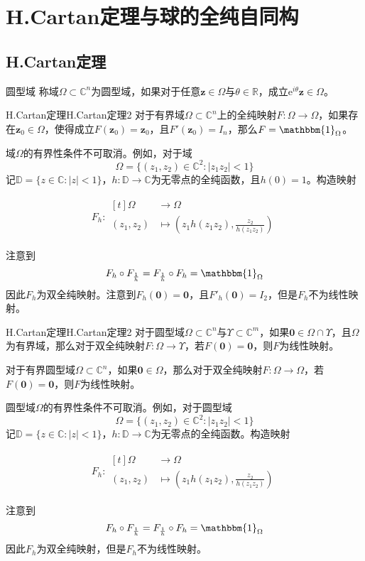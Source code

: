\documentclass[lang = cn, scheme = chinese, thmcnt = section]{elegantbook}
\newcommand{\R}{\mathbb{R}}            %
\newcommand{\C}{\mathbb{C}}  		   %
\newcommand{\sub}{\subset}             %
\newcommand{\bs}{\boldsymbol}          %
\newcommand{\function}[5]{
	\begin{align*}
		#1:\begin{aligned}[t]
			#2 &\longrightarrow #3\\
			#4 &\longmapsto #5
		\end{aligned}
	\end{align*}
}                                     %
\begin{document}
\section{H.Cartan定理与球的全纯自同构}

\subsection{H.Cartan定理}

\begin{definition}{圆型域}
	称域$\Omega\sub\C^n$为圆型域，如果对于任意$\bs{z}\in\Omega$与$\theta\in\R$，成立$\mathrm{e}^{i\theta}\bs{z}\in \Omega$。
\end{definition}

\begin{theorem}{H.Cartan定理}{H.Cartan定理2}
	对于有界域$\Omega\sub\C^n$上的全纯映射$F:\Omega\to\Omega$，如果存在$\bs{z}_0\in \Omega$，使得成立$F(\bs{z}_0)=\bs{z}_0$，且$F'(\bs{z}_0)=I_n$，那么$F=\mathbbm{1}_{\Omega}$。
\end{theorem}

\begin{remark}
	域$\Omega$的有界性条件不可取消。例如，对于域
	$$
	\Omega=\{ (z_1,z_2)\in\C^2:|z_1z_2|<1 \}
	$$
	记$\mathbb{D}=\{ z\in\C:|z|<1 \}$，$h:\mathbb{D}\to\C$为无零点的全纯函数，且$h(0)=1$。构造映射
	\function{F_h}{\Omega}{\Omega}{(z_1,z_2)}{\left(z_1h(z_1z_2),\frac{z_2}{h(z_1z_2)}\right)}
	注意到
	$$
	F_h\circ F_{\frac{1}{h}}=F_{\frac{1}{h}}\circ F_h=\mathbbm{1}_\Omega
	$$
	因此$F_h$为双全纯映射。注意到$F_h(\bs{0})=\bs{0}$，且$F'_h(\bs{0})=I_2$，但是$F_h$不为线性映射。
\end{remark}

\begin{theorem}{H.Cartan定理}{H.Cartan定理2}
	对于圆型域$\Omega\sub\C^n$与$\Upsilon\sub\C^m$，如果$\bs{0}\in \Omega\cap\Upsilon$，且$\Omega$为有界域，那么对于双全纯映射$F:\Omega\to\Upsilon$，若$F(\bs{0})=\bs{0}$，则$F$为线性映射。
\end{theorem}

\begin{corollary}
	对于有界圆型域$\Omega\sub\C^n$，如果$\bs{0}\in \Omega$，那么对于双全纯映射$F:\Omega\to\Omega$，若$F(\bs{0})=\bs{0}$，则$F$为线性映射。
\end{corollary}

\begin{remark}
	圆型域$\Omega$的有界性条件不可取消。例如，对于圆型域
	$$
	\Omega=\{ (z_1,z_2)\in\C^2:|z_1z_2|<1 \}
	$$
	记$\mathbb{D}=\{ z\in\C:|z|<1 \}$，$h:\mathbb{D}\to\C$为无零点的全纯函数。构造映射
	\function{F_h}{\Omega}{\Omega}{(z_1,z_2)}{\left(z_1h(z_1z_2),\frac{z_2}{h(z_1z_2)}\right)}
	注意到
	$$
	F_h\circ F_{\frac{1}{h}}=F_{\frac{1}{h}}\circ F_h=\mathbbm{1}_\Omega
	$$
	因此$F_h$为双全纯映射，但是$F_h$不为线性映射。
\end{remark}
\end{document}
